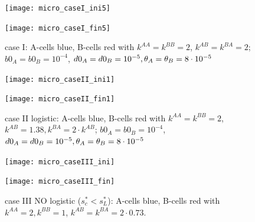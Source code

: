 \begin{figure}[htb]
	\begin{minipage}[t]{.45\textwidth}
		\centering
		\texttt{[image: micro\_caseI\_ini5]}
	\end{minipage}
	\hfill
	\begin{minipage}[t]{.45\textwidth}
		\centering
		\texttt{[image: micro\_caseI\_fin5]}
	\end{minipage}  
	\caption{{case I: A-cells blue, B-cells red with $k^{AA}=k^{BB}=2 $, $k^{AB}=k^{BA}=2$; $b0_A=b0_B=10^{-4}$, $d0_A=d0_B=10^{-5}, {\theta}_A={\theta}_B=8\cdot 10^{-5}$}}
\end{figure}



\begin{figure}[htb]
	\begin{minipage}[t]{.45\textwidth}
		\centering
		\texttt{[image: micro\_caseII\_ini1]}
	\end{minipage}
	\hfill
	\begin{minipage}[t]{.45\textwidth}
		\centering
		\texttt{[image: micro\_caseII\_fin1]}
	\end{minipage}  
	\caption{{case II logistic: A-cells blue, B-cells red with $k^{AA}=k^{BB}=2 $, $k^{AB}=1.38, k^{BA}=2\cdot k^{AB}$; $b0_A=b0_B=10^{-4}$, $d0_A=d0_B=10^{-5}, {\theta}_A={\theta}_B=8\cdot 10^{-5}$}}
\end{figure}




\begin{figure}[htb]
	\begin{minipage}[t]{.45\textwidth}
		\centering
		\texttt{[image: micro\_caseIII\_ini]}
	\end{minipage}
	\hfill
	\begin{minipage}[t]{.45\textwidth}
		\centering
		\texttt{[image: micro\_caseIII\_fin]}
	\end{minipage}  
	\caption{{case III NO logistic ($s^{*}_{c} < s^{*}_{L}$): A-cells blue, B-cells red with $k^{AA}=2, k^{BB}=1 $, $k^{AB}=k^{BA}=2\cdot 0.73$.}}
\end{figure}




